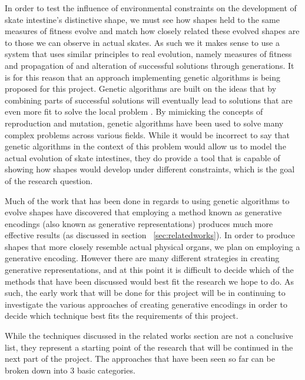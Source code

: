 \documentclass[condensed]{union-cs-thesis}
\begin{document}
In order to test the influence of environmental constraints on the development of skate intestine's
distinctive shape, we must see how shapes held to the same measures of fitness evolve and match how
closely related these evolved shapes are to those we can observe in actual skates.  As such we it makes 
sense to use a system that uses similar principles to real evolution, namely measures of fitness and
propagation of and alteration of successful solutions through generations.  It is for this reason that
an approach implementing genetic algorithms is being proposed for this project.  Genetic algorithms are
built on the ideas that by combining parts of successful solutions will eventually lead to solutions that
are even more fit to solve the local problem \cite{mitchell1998introduction}.  By mimicking the concepts
of reproduction and mutation, genetic algorithms have been used to solve many complex problems across
various fields.  While it would be incorrect to say that genetic algorithms in the context of this problem
would allow us to model the actual evolution of skate intestines, they do provide a tool that is capable
of showing how shapes would develop under different constraints, which is the goal of the research question.

\par
Much of the work that has been done in regards to using genetic algorithms to evolve shapes have discovered 
that employing a method known as generative encodings (also known as generative representations) produces
much more effective results (as discussed in section ~\ref{sec:relatedworks}).  In order to produce shapes
that more closely resemble actual physical organs, we plan on employing a generative encoding.  However
there are many different strategies in creating generative representations, and at this point it is difficult
to decide which of the methods that have been discussed would best fit the research we hope to do.  As such,
the early work that will be done for this project will be in continuing to investigate the various approaches
of creating generative encodings in order to decide which technique best fits the requirements of this project.

\par
While the techniques discussed in the related works section are not a conclusive list, they represent a starting
point of the research that will be continued in the next part of the project.  The approaches that have been seen
so far can be broken down into 3 basic categories.
\end{document}
